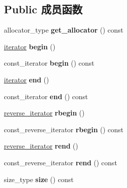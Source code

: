 \subsection*{Public 成员函数}
\begin{DoxyCompactItemize}
\item 
\mbox{\label{structvector_aa3f9918713c619780bf637900265b63c}} 
allocator\+\_\+type {\bfseries get\+\_\+allocator} () const
\item 
\mbox{\label{structvector_a91331710902de21946f9f22c4b027f2b}} 
\hyperlink{structiterator}{iterator} {\bfseries begin} ()
\item 
\mbox{\label{structvector_a13640884d2e3cdcad88857c551de34b0}} 
const\+\_\+iterator {\bfseries begin} () const
\item 
\mbox{\label{structvector_a0ed3ad42be9f6d5793dcaa5307e7d2e4}} 
\hyperlink{structiterator}{iterator} {\bfseries end} ()
\item 
\mbox{\label{structvector_a1fa209a2ebabb1df947fcd4adde9783f}} 
const\+\_\+iterator {\bfseries end} () const
\item 
\mbox{\label{structvector_a3ee188b5bf6c595bc18f8a0123d48f56}} 
\hyperlink{classreverse__iterator}{reverse\+\_\+iterator} {\bfseries rbegin} ()
\item 
\mbox{\label{structvector_a9f4fbafdb86447543b9b792d6be451c7}} 
const\+\_\+reverse\+\_\+iterator {\bfseries rbegin} () const
\item 
\mbox{\label{structvector_aab8dc03aa6d6888f249e8475578892dd}} 
\hyperlink{classreverse__iterator}{reverse\+\_\+iterator} {\bfseries rend} ()
\item 
\mbox{\label{structvector_a8a35a4bf7f3200747702d1188ba25afb}} 
const\+\_\+reverse\+\_\+iterator {\bfseries rend} () const
\item 
\mbox{\label{structvector_a9e99025ce65ac17571d8707bcb5af9c8}} 
size\+\_\+type {\bfseries size} () const
\item 
\mbox{\label{structvector_a43dfb7e0a66435621fa9018cffb79ac1}} 

\end{DoxyCompactItemize}
